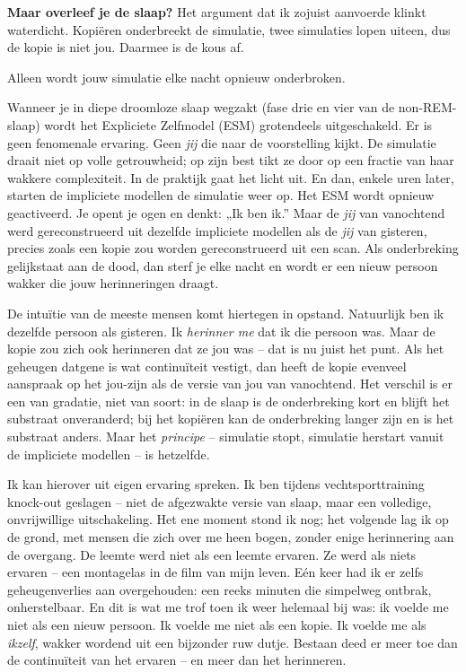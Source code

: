 \documentclass[11pt, twoside, openright]{book}
\begin{document}
\textbf{Maar overleef je de slaap?} Het argument dat ik zojuist aanvoerde klinkt waterdicht. Kopiëren onderbreekt de simulatie, twee simulaties lopen uiteen, dus de kopie is niet jou. Daarmee is de kous af.

Alleen wordt jouw simulatie elke nacht opnieuw onderbroken.

Wanneer je in diepe droomloze slaap wegzakt (fase drie en vier van de non-REM-slaap) wordt het Expliciete Zelfmodel (ESM) grotendeels uitgeschakeld. Er is geen fenomenale ervaring. Geen \textit{jij} die naar de voorstelling kijkt. De simulatie draait niet op volle getrouwheid; op zijn best tikt ze door op een fractie van haar wakkere complexiteit. In de praktijk gaat het licht uit. En dan, enkele uren later, starten de impliciete modellen de simulatie weer op. Het ESM wordt opnieuw geactiveerd. Je opent je ogen en denkt: „Ik ben ik.” Maar de \textit{jij} van vanochtend werd gereconstrueerd uit dezelfde impliciete modellen als de \textit{jij} van gisteren, precies zoals een kopie zou worden gereconstrueerd uit een scan. Als onderbreking gelijkstaat aan de dood, dan sterf je elke nacht en wordt er een nieuw persoon wakker die jouw herinneringen draagt.

De intuïtie van de meeste mensen komt hiertegen in opstand. Natuurlijk ben ik dezelfde persoon als gisteren. Ik \textit{herinner me} dat ik die persoon was. Maar de kopie zou zich ook herinneren dat ze jou was -- dat is nu juist het punt. Als het geheugen datgene is wat continuïteit vestigt, dan heeft de kopie evenveel aanspraak op het jou-zijn als de versie van jou van vanochtend. Het verschil is er een van gradatie, niet van soort: in de slaap is de onderbreking kort en blijft het substraat onveranderd; bij het kopiëren kan de onderbreking langer zijn en is het substraat anders. Maar het \textit{principe} -- simulatie stopt, simulatie herstart vanuit de impliciete modellen -- is hetzelfde.

Ik kan hierover uit eigen ervaring spreken. Ik ben tijdens vechtsporttraining knock-out geslagen -- niet de afgezwakte versie van slaap, maar een volledige, onvrijwillige uitschakeling. Het ene moment stond ik nog; het volgende lag ik op de grond, met mensen die zich over me heen bogen, zonder enige herinnering aan de overgang. De leemte werd niet als een leemte ervaren. Ze werd als niets ervaren -- een montagelas in de film van mijn leven. Eén keer had ik er zelfs geheugenverlies aan overgehouden: een reeks minuten die simpelweg ontbrak, onherstelbaar. En dit is wat me trof toen ik weer helemaal bij was: ik voelde me niet als een nieuw persoon. Ik voelde me niet als een kopie. Ik voelde me als \textit{ikzelf}, wakker wordend uit een bijzonder ruw dutje. Bestaan deed er meer toe dan de continuïteit van het ervaren -- en meer dan het herinneren.
\end{document}
